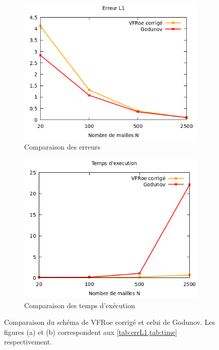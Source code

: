 \documentclass[
	french,
	11pt, %
]{fphw}
\begin{document}
\begin{figure}[H]
	\centering
	\begin{subfigure}[b]{0.4\textwidth}
		\centering
		\includegraphics[width=\textwidth]{VFRoeVSgoduERR.png}
		\caption{Comparaison des erreurs}
		\label{fig:VFRoeVSgoduA}
	\end{subfigure}
	\begin{subfigure}[b]{0.4\textwidth}
		\centering
		\includegraphics[width=\textwidth]{VFRoeVSgoduTIME.png}
		\caption{Comparaison des temps d'exécution}
		\label{fig:VFRoeVSgoduB}
	\end{subfigure}
	\caption{Comparaison du schéma de VFRoe corrigé et celui de Godunov. Les figures (a) et (b) correspondent aux \cref{tab:errL1,tab:time} respectivement.}
	\label{fig:VFRoeVSgodu}
\end{figure}
\end{document}
